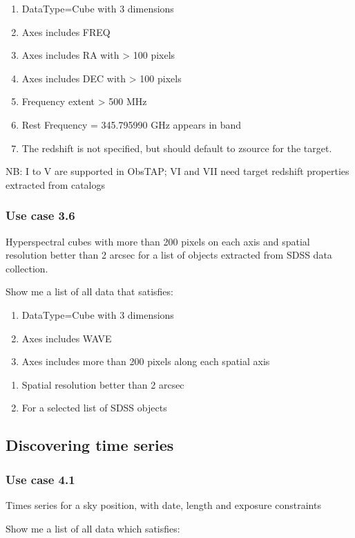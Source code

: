 \documentclass[11pt,a4paper]{ivoa}
\begin{document}
\begin{enumerate}
\item DataType=Cube with 3 dimensions
\item Axes includes FREQ
\item Axes includes RA with {\textgreater} 100 pixels
\item Axes includes DEC with {\textgreater} 100 pixels
\item Frequency extent {\textgreater} 500 MHz
\item Rest Frequency = 345.795990 GHz appears in band
\item The redshift is not specified, but should default to zsource for the target.
\end{enumerate}
NB: I to V are supported in ObsTAP; VI and VII need target redshift properties extracted from catalogs

\subsubsection{Use case 3.6}
Hyperspectral cubes with more than 200 pixels on each axis and spatial resolution better than 2 arcsec for a list of
objects extracted from SDSS data collection.

Show me a list of all data that satisfies:

\begin{enumerate}
\item DataType=Cube with 3 dimensions
\item Axes includes WAVE
\item Axes includes more than 200 pixels along each spatial axis
\end{enumerate}
\begin{enumerate}
\item Spatial resolution better than 2 arcsec
\item For  a selected list of SDSS objects
\end{enumerate}

\subsection[Discovering time series]{Discovering time series}
\subsubsection[Use case 4.1]{Use case 4.1}
Times series for a sky position, with date, length and exposure constraints

Show me a list of all data which satisfies:
\end{document}
